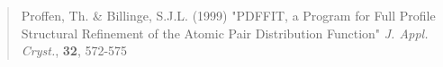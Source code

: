 \documentclass[11pt]{report}
\begin{document}
\begin{quote}
  {\sc Proffen, Th. \& Billinge, S.J.L.} (1999) "PDFFIT, a Program
  for Full Profile Structural Refinement of the Atomic Pair
  Distribution Function" {\it J. Appl. Cryst.}, {\bf 32}, 572-575
\end{quote}


\tableofcontents

%
%











\appendix






\end{document}
